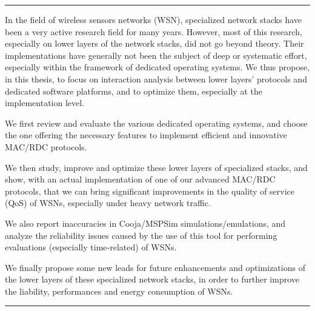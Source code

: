 \documentclass[11pt,a4paper,twoside]{thesul}
\begin{document}
\begin{ThesisAbstract}
\begin{FrenchAbstract}
  \end{FrenchAbstract}

 \hrule

  \begin{EnglishAbstract}

  In the field of wireless sensors networks (WSN), specialized network 
  stacks have been a very active research field for many years.
  However, most of this research, especially on lower layers of the network
  stacks, did not go beyond theory. Their implementations have generally not
  been the subject of deep or systematic effort, especially within the
  framework of dedicated operating systems. We thus propose, in this
  thesis, to focus on interaction analysis between lower layers' protocols
  and dedicated software platforms, and to optimize them, especially at
  the implementation level.

  We first review and evaluate the various dedicated operating
  systems, and choose the one offering the necessary features
  to implement efficient and innovative MAC/RDC protocols.

  We then study, improve and optimize these lower layers of specialized
  stacks, and show, with an actual implementation of one of our advanced
  MAC/RDC protocols, that we can bring significant improvements in the
  quality of service (QoS) of WSNs, especially under heavy network traffic.

  We also report inaccuracies in Cooja/MSPSim simulations/emulations,
  and analyze the reliability issues caused by the use of this tool for
  performing evaluations (especially time-related) of WSNs.

  We finally propose some new leads for future enhancements and
  optimizations of the lower layers of these specialized network stacks,
  in order to further improve the liability, performances and energy
  consumption of WSNs.


  \end{EnglishAbstract}

 \hrule

\end{ThesisAbstract}



\end{document}
